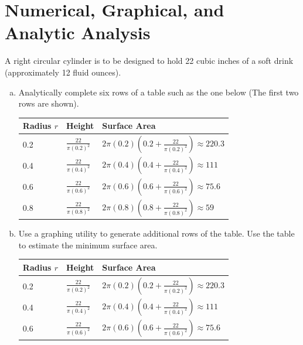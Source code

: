 \documentclass[11pt]{article}
\begin{document}
\section{Numerical, Graphical, and Analytic Analysis}
A right circular cylinder is to be designed to hold 22 cubic inches of a soft drink (approximately 12 fluid ounces).
\begin{enumerate}[(a)]
    \item Analytically complete six rows of a table such as the one below (The first two rows are shown).
        \begin{flushleft}
            \begin{table}[h]
                \begin{tabular}{|l|l|l|}
                \hline
                    Radius $r$ & Height & Surface Area\\\hline
                    0.2 & $\frac{22}{\pi(0.2)^2}$ & $2\pi(0.2)\left(0.2+\frac{22}{\pi(0.2)^2}\right)\approx 220.3$\\\hline
                    0.4 & $\frac{22}{\pi(0.4)^2}$ & $2\pi(0.4)\left(0.4+\frac{22}{\pi(0.4)^2}\right)\approx 111$\\\hline
                    0.6 & $\frac{22}{\pi(0.6)^2}$ & $2\pi(0.6)\left(0.6+\frac{22}{\pi(0.6)^2}\right)\approx 75.6$\\\hline
                    0.8 & $\frac{22}{\pi(0.8)^2}$ & $2\pi(0.8)\left(0.8+\frac{22}{\pi(0.8)^2}\right)\approx 59$\\
                \hline
                \end{tabular}
            \end{table}
        \end{flushleft}
    \item Use a graphing utility to generate additional rows of the table. Use the table to estimate the minimum surface area.
    \begin{flushleft}
        \begin{table}[h]
            \begin{tabular}{|l|l|l|}\hline
                Radius $r$ & Height & Surface Area\\\hline
                0.2 & $\frac{22}{\pi(0.2)^2}$ & $2\pi(0.2)\left(0.2+\frac{22}{\pi(0.2)^2}\right)\approx 220.3$\\\hline
                0.4 & $\frac{22}{\pi(0.4)^2}$ & $2\pi(0.4)\left(0.4+\frac{22}{\pi(0.4)^2}\right)\approx 111$\\\hline
                0.6 & $\frac{22}{\pi(0.6)^2}$ & $2\pi(0.6)\left(0.6+\frac{22}{\pi(0.6)^2}\right)\approx 75.6$\\\hline

\end{tabular}
\end{table}
\end{flushleft}
\end{enumerate}
\end{document}
